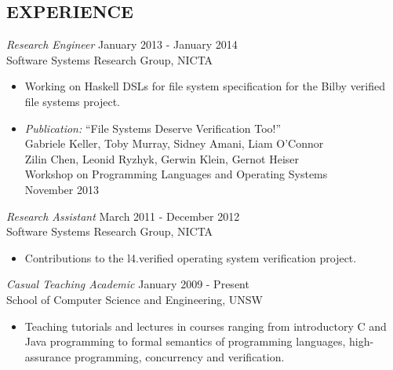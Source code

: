 \documentclass[line,margin]{res}
\begin{document}
\begin{resume}
\section{EXPERIENCE} {\sl Research Engineer} \hfill January 2013 - January 2014 \\
                 Software Systems Research Group, NICTA
                 \begin{itemize}  \itemsep -2pt %
                \item  Working on Haskell DSLs for file system specification
                       for the Bilby verified file systems project.
                \item \emph{Publication:} ``File Systems Deserve Verification Too!'' \\
                        \small
                          Gabriele Keller, Toby Murray, Sidney Amani, Liam O'Connor \\
                          Zilin Chen, Leonid Ryzhyk, Gerwin Klein, Gernot Heiser \\
                          Workshop on Programming Languages and Operating Systems \\
                          November 2013
                          \normalsize

                \end{itemize}
 
                {\sl Research Assistant} \hfill March 2011 - December 2012 \\
                 Software Systems Research Group, NICTA
                 \begin{itemize}  \itemsep -2pt %
                 \item Contributions to the l4.verified operating system verification project.
                 \end{itemize} 
                {\sl Casual Teaching Academic} \hfill January 2009 - Present \\
                 School of Computer Science and Engineering, UNSW
                  \begin{itemize}
                    \item Teaching tutorials and lectures in courses ranging from introductory C and Java programming to
                         formal semantics of programming languages, high-assurance programming,
                         concurrency and verification.
                   \end{itemize} 
 

\end{resume}
\end{document}
